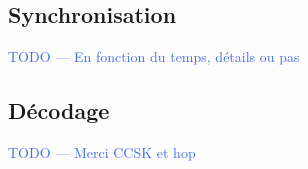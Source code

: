 \documentclass[../main.tex]{subfiles}
\begin{document}
\subsection{Synchronisation}

\begin{frame}{\subsecname}
  \begin{center}
    \textcolor{RoyalBlue}{TODO --- En fonction du temps, détails ou pas}
  \end{center}
\end{frame}

\subsection{Décodage}

\begin{frame}{\subsecname}
  \begin{center}
    \textcolor{RoyalBlue}{TODO --- Merci CCSK et hop}
  \end{center}
\end{frame}
\end{document}

